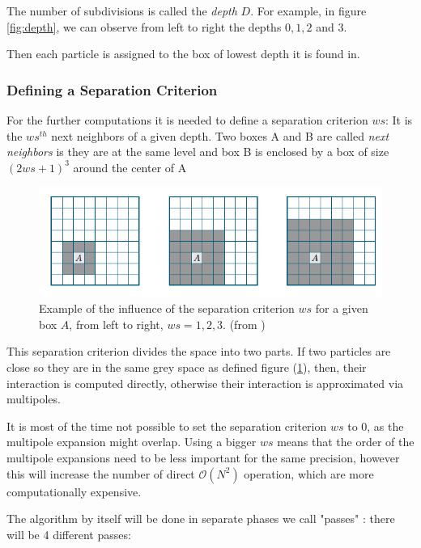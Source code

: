 \documentclass[10pt,twoside,a4paper]{report}
\begin{document}
    
    The number of subdivisions is called the \textit{depth} $D$. For example, in figure \ref{fig:depth}, we can observe from left to right the depths $0,1,2$ and $3$.
    
    Then each particle is assigned  to the box of lowest depth it is found in.
    
	\subsubsection{Defining a Separation Criterion}
	
	For the further computations it is needed to define a separation criterion $ws$: It is the $ws^{th}$ next neighbors of a given depth. Two boxes A and B are called \textit{next neighbors} is they are at the same level and box B is enclosed by a box of size $(2 ws + 1)^3$ around the center of A 
	
	
	
	
	\begin{figure}[H]
    \includegraphics[scale=0.7]{separation}    
    \centering 
    \caption{Example of the influence of the separation criterion $ws$ for a given box $A$, from left to right, $ws = 1,2,3$. (from \cite{phdIvo})}    
    \label{fig:separation}
     \end{figure}
	
		This separation criterion divides the space into two parts. If two particles are close so they are in the same grey space as defined figure (\ref{fig:separation}), then, their interaction is computed directly, otherwise their interaction is approximated via multipoles.
	
	It is most of the time not possible to set the separation criterion $ws$ to 0, as the multipole expansion might overlap. Using a bigger $ws$ means that the order of the multipole expansions need to be less important for the same precision, however this will increase the number of direct $\mathcal{O}(N^2)$ operation, which are  more computationally expensive.       
    
    
	The algorithm by itself will be done in separate phases we call "passes" : there will be 4 different passes:
	
\end{document}
